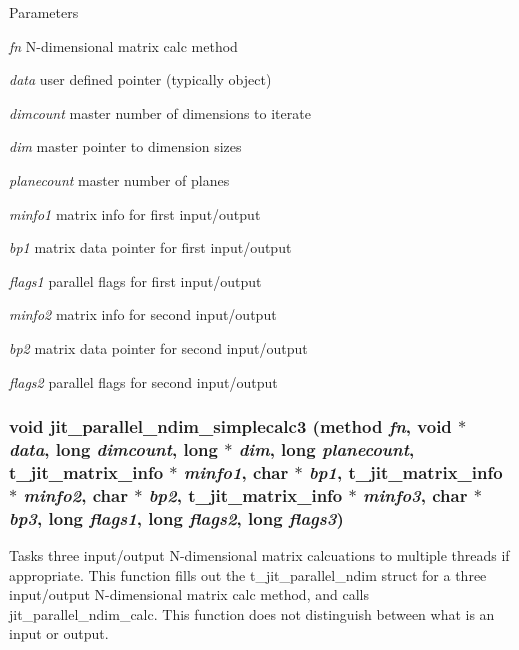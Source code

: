 \begin{DoxyParams}{Parameters}
\item[{\em fn}]N-\/dimensional matrix calc method \item[{\em data}]user defined pointer (typically object) \item[{\em dimcount}]master number of dimensions to iterate \item[{\em dim}]master pointer to dimension sizes \item[{\em planecount}]master number of planes \item[{\em minfo1}]matrix info for first input/output \item[{\em bp1}]matrix data pointer for first input/output \item[{\em flags1}]parallel flags for first input/output \item[{\em minfo2}]matrix info for second input/output \item[{\em bp2}]matrix data pointer for second input/output \item[{\em flags2}]parallel flags for second input/output \end{DoxyParams}
\hypertarget{group__parallelutilmod_ga56ab668e990aecaa80cd0d37b8123c36}{
\subsubsection[{jit\_\-parallel\_\-ndim\_\-simplecalc3}]{\setlength{\rightskip}{0pt plus 5cm}void jit\_\-parallel\_\-ndim\_\-simplecalc3 ({\bf method} {\em fn}, \/  void $\ast$ {\em data}, \/  long {\em dimcount}, \/  long $\ast$ {\em dim}, \/  long {\em planecount}, \/  {\bf t\_\-jit\_\-matrix\_\-info} $\ast$ {\em minfo1}, \/  char $\ast$ {\em bp1}, \/  {\bf t\_\-jit\_\-matrix\_\-info} $\ast$ {\em minfo2}, \/  char $\ast$ {\em bp2}, \/  {\bf t\_\-jit\_\-matrix\_\-info} $\ast$ {\em minfo3}, \/  char $\ast$ {\em bp3}, \/  long {\em flags1}, \/  long {\em flags2}, \/  long {\em flags3})}}
\label{group__parallelutilmod_ga56ab668e990aecaa80cd0d37b8123c36}


Tasks three input/output N-\/dimensional matrix calcuations to multiple threads if appropriate. This function fills out the t\_\-jit\_\-parallel\_\-ndim struct for a three input/output N-\/dimensional matrix calc method, and calls jit\_\-parallel\_\-ndim\_\-calc. This function does not distinguish between what is an input or output.


